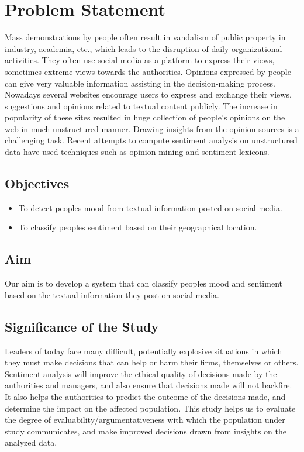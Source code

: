 

\chapter{Problem Statement}
Mass demonstrations by people often result in vandalism of public property in industry, academia, etc., which leads to the disruption of daily organizational activities. They often use social media as a platform to express their views, sometimes extreme views towards the authorities. Opinions expressed by people can give very valuable information assisting in the decision-making process. Nowadays several websites encourage users to express and exchange their views, suggestions and opinions related to textual content publicly. The increase in popularity of these sites resulted in huge collection of people's opinions on the web in much unstructured manner. Drawing insights from the opinion sources is a challenging task. Recent attempts to compute sentiment analysis on unstructured data have used techniques such as opinion mining and sentiment lexicons.


\section{Objectives}

\begin{itemize}
\item To detect people\textquotesingle s mood from textual information posted on social media.
\item To classify people\textquotesingle s sentiment based on their geographical location.
\end{itemize}

\section{Aim}

Our aim is to develop a system that can classify people\textquotesingle s mood and sentiment based on the textual information they post on social media.



\section{Significance of the Study}
Leaders of today face many difficult, potentially explosive situations in which they must make decisions that can help or harm their firms, themselves or others. Sentiment analysis will improve the ethical quality of decisions made by the authorities and managers, and also ensure that decisions made will not backfire. It also helps the authorities to predict the outcome of the decisions made, and determine the impact on the affected population. This study helps us to evaluate the degree of evaluability/argumentativeness with which the population under study communicates, \cite{ref5} and make improved decisions drawn from insights on the analyzed data.



